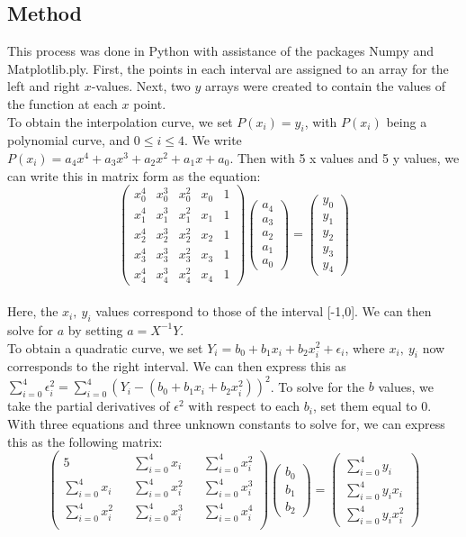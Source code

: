 \documentclass[12pt]{article}
\begin{document}
\subsection*{Method}
This process was done in Python with assistance of the packages Numpy and Matplotlib.ply. First, the points in each interval are assigned to an array for the left and right $x$-values. Next, two $y$ arrays were created to contain the values of the function at each $x$ point. 
\\To obtain the interpolation curve, we set $P(x_i) = y_i$, with $P(x_i)$ being a polynomial curve, and $0\leq i \leq 4$. We write $P(x_i) = a_4x^4 + a_3x^3 + a_2 x^2 +a_1 x + a_0$. Then with 5 x values and 5 y values, we can write this in matrix form as the equation:
$$\begin{pmatrix}
x_0^4&x_0^3&x_0^2&x_0&1
\\x_1^4&x_1^3&x_1^2&x_1&1
\\x_2^4&x_2^3&x_2^2&x_2&1
\\x_3^4&x_3^3&x_3^2&x_3&1
\\x_4^4&x_4^3&x_4^2&x_4&1
\end{pmatrix} 
\begin{pmatrix}
a_4\\a_3\\a_2\\a_1\\a_0
\end{pmatrix}
=
\begin{pmatrix}
y_0\\y_1\\y_2\\y_3\\y_4
\end{pmatrix}$$
\\Here, the $x_i,~y_i$ values correspond to those of the interval [-1,0]. We can then solve for $a$ by setting $a = X^{-1}Y$. 
\\To obtain a quadratic curve, we set $Y_i = b_0 + b_1 x_i + b_2 x_i^2+\epsilon_i$, where $x_i,~y_i$ now corresponds to the right interval. We can then express this as $\sum_{i = 0}^{4}\epsilon_i^2=\sum_{i = 0}^{4}(Y_i - (b_0 + b_1 x_i + b_2 x_i^2))^2$.
To solve for the $b$ values, we take the partial derivatives of $\epsilon^2$ with respect to each $b_i$, set them equal to 0. With three equations and three unknown constants to solve for, we can express this as the following matrix:
$$\begin{pmatrix}
5&&\sum_{i=0}^{4}x_i&&\sum_{i=0}^{4}x_i^2\\
\sum_{i=0}^{4}x_i&&\sum_{i=0}^{4}x_i^2&&\sum_{i=0}^{4}x_i^3\\
\sum_{i=0}^{4}x_i^2&&\sum_{i=0}^{4}x_i^3&&\sum_{i=0}^{4}x_i^4\\
\end{pmatrix}
\begin{pmatrix}
b_0\\b_1\\b_2
\end{pmatrix}
=\begin{pmatrix}
\sum_{i=0}^{4}y_i\\\sum_{i=0}^{4}y_ix_i\\\sum_{i=0}^{4}y_ix_i^2
\end{pmatrix}$$
\end{document}
